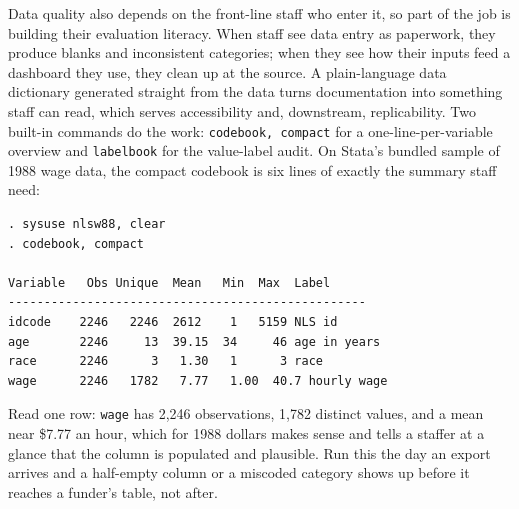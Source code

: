 \documentclass[
    a4paper,
    fontsize=10pt,
    twoside=true,
    numbers=noenddot,
]{kaobook}
\begin{document}
Data quality also depends on the front-line staff who enter it, so part of the job is building their evaluation literacy. When staff see data entry as paperwork, they produce blanks and inconsistent categories; when they see how their inputs feed a dashboard they use, they clean up at the source. A plain-language data dictionary generated straight from the data turns documentation into something staff can read, which serves accessibility and, downstream, replicability. Two built-in commands do the work: \texttt{codebook, compact} for a one-line-per-variable overview and \texttt{labelbook} for the value-label audit. On Stata's bundled sample of 1988 wage data, the compact codebook is six lines of exactly the summary staff need:
{\footnotesize
\begin{verbatim}
. sysuse nlsw88, clear
. codebook, compact

Variable   Obs Unique  Mean   Min  Max  Label
--------------------------------------------------
idcode    2246   2246  2612    1   5159 NLS id
age       2246     13  39.15  34     46 age in years
race      2246      3   1.30   1      3 race
wage      2246   1782   7.77   1.00  40.7 hourly wage
\end{verbatim}
}
Read one row: \texttt{wage} has 2{,}246 observations, 1{,}782 distinct values, and a mean near \$7.77 an hour, which for 1988 dollars makes sense and tells a staffer at a glance that the column is populated and plausible. Run this the day an export arrives and a half-empty column or a miscoded category shows up before it reaches a funder's table, not after.
\end{document}
